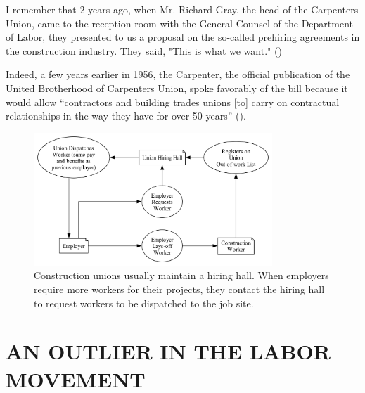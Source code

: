 \documentclass[12pt]{article}
\newcommand{\imageWidth}{0.8\textwidth}
\renewenvironment{quote}
  {\list{}{\leftmargin=\parindent\rightmargin=0pt}%
   \item\relax}
  {\endlist}
\begin{document}
\begin{quote}
I remember that 2 years ago, when Mr. Richard Gray, the head of the Carpenters Union, came to the reception room with the General Counsel of the Department of Labor, they presented to us a proposal on the so-called prehiring agreements in the construction industry. They said, "This is what we want." (\cite[6414]{105CongressionalRecord1959})
\end{quote}

\noindent{}Indeed, a few years earlier in 1956, the Carpenter, the official publication of the United Brotherhood of Carpenters Union, spoke favorably of the bill because it would allow “contractors and building trades unions [to] carry on contractual relationships in the way they have for over 50 years” (\cite[7--8]{ubcActionTalksSay1956}).

\begin{figure}[ht]
  \centering
  \includegraphics[width=\imageWidth]{images/hiring_hall}
  \captionsetup{justification=centering, singlelinecheck=false, margin=2cm} 
  \caption[Union Hiring Hall]{Construction unions usually maintain a hiring hall. When employers require more workers for their projects, they contact the hiring hall to request workers to be dispatched to the job site.}
  \label{fig:hiring_hall}
\end{figure}

\section{AN OUTLIER IN THE LABOR MOVEMENT}
\end{document}
